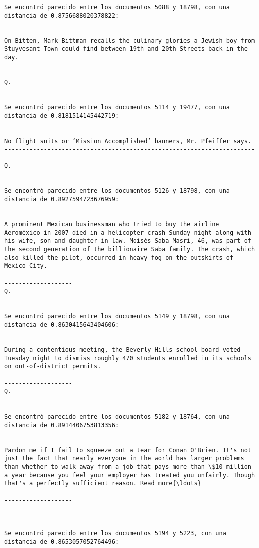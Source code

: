 \documentclass[11pt]{article}
\begin{document}
\begin{Verbatim}[commandchars=\\\{\}]
Se encontró parecido entre los documentos 5088 y 18798, con una distancia de 0.8756688020378822:


On Bitten, Mark Bittman recalls the culinary glories a Jewish boy from Stuyvesant Town could find between 19th and 20th Streets back in the day.
-----------------------------------------------------------------------------------------
Q.


Se encontró parecido entre los documentos 5114 y 19477, con una distancia de 0.8181514145442719:


No flight suits or ‘Mission Accomplished’ banners, Mr. Pfeiffer says.
-----------------------------------------------------------------------------------------
Q.


Se encontró parecido entre los documentos 5126 y 18798, con una distancia de 0.8927594723676959:


A prominent Mexican businessman who tried to buy the airline Aeroméxico in 2007 died in a helicopter crash Sunday night along with his wife, son and daughter-in-law. Moisés Saba Masri, 46, was part of the second generation of the billionaire Saba family. The crash, which also killed the pilot, occurred in heavy fog on the outskirts of Mexico City.
-----------------------------------------------------------------------------------------
Q.


Se encontró parecido entre los documentos 5149 y 18798, con una distancia de 0.8630415643404606:


During a contentious meeting, the Beverly Hills school board voted Tuesday night to dismiss roughly 470 students enrolled in its schools on out-of-district permits.
-----------------------------------------------------------------------------------------
Q.


Se encontró parecido entre los documentos 5182 y 18764, con una distancia de 0.8914406753813356:


Pardon me if I fail to squeeze out a tear for Conan O'Brien. It's not just the fact that nearly everyone in the world has larger problems than whether to walk away from a job that pays more than \$10 million a year because you feel your employer has treated you unfairly. Though that's a perfectly sufficient reason. Read more{\ldots}
-----------------------------------------------------------------------------------------



Se encontró parecido entre los documentos 5194 y 5223, con una distancia de 0.8653057052764496:



\end{Verbatim}
\end{document}
